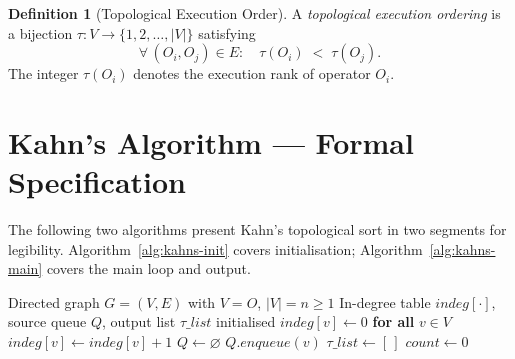 \documentclass[12pt,openany]{book}
\numberwithin{equation}{chapter}
\theoremstyle{plain}
\theoremstyle{definition}
\newtheorem{definition}[theorem]{Definition}
\theoremstyle{remark}
\numberwithin{equation}{chapter}
\theoremstyle{plain}
\newcommand{\calO}{\mathcal{O}}
\def\calO{O}%
\begin{document}
\begin{definition}[Topological Execution Order]
\label{def:topo-order}
A \emph{topological execution ordering} is a bijection
$\tau : V \to \{1, 2, \ldots, |V|\}$ satisfying
\begin{equation}
  \forall\, (O_i, O_j) \in E:\quad
  \tau(O_i) \;<\; \tau(O_j).
  \label{eq:topo-order}
\end{equation}
The integer $\tau(O_i)$ denotes the execution rank of operator $O_i$.
\end{definition}

\section{Kahn's Algorithm --- Formal Specification}
\label{sec:kahns-algo}

The following two algorithms present Kahn's topological sort in two
segments for legibility.  Algorithm~\ref{alg:kahns-init} covers
initialisation; Algorithm~\ref{alg:kahns-main} covers the main loop
and output.

\begin{algorithm}[H]
\caption{Kahn's Topological Sort --- Initialisation}
\label{alg:kahns-init}
\begin{algorithmic}[1]
  \Require Directed graph $G = (V, E)$ with $V = \calO$,
           $|V| = n \geq 1$
  \Ensure In-degree table $\mathit{indeg}[\cdot]$,
          source queue $Q$, output list $\tau\_list$ initialised
  \State $\mathit{indeg}[v] \leftarrow 0$ \quad
         \textbf{for all} $v \in V$
    \State $\mathit{indeg}[v] \leftarrow \mathit{indeg}[v] + 1$
  \EndFor
  \State $Q \leftarrow \varnothing$
      \State $Q.\mathit{enqueue}(v)$
    \EndIf
  \EndFor
  \State $\tau\_list \leftarrow [\,]$
  \State $\mathit{count} \leftarrow 0$
\end{algorithmic}
\end{algorithm}
\end{document}
